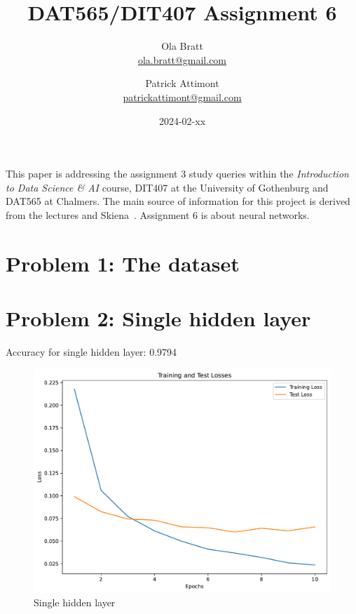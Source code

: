 \documentclass[a4paper]{article}
\begin{document}
\author{Ola Bratt \\
  \href{mailto:ola.bratt@gmail.com}{ola.bratt@gmail.com}
  \and
  Patrick Attimont \\
  \href{patrickattimont@gmail.com}{patrickattimont@gmail.com}
}

\title{DAT565/DIT407 Assignment 6}
\date{2024-02-xx}

\maketitle

This paper is addressing the assignment 3 study queries within the \emph{Introduction to Data Science \& AI} course, DIT407 at 
the University of Gothenburg and DAT565 at Chalmers. The main source of information for this project
is derived from the lectures and Skiena~\cite{Skiena:2024}. Assignment 6 is about neural networks.

\section*{Problem 1: The dataset}


\section*{Problem 2: Single hidden layer}

Accuracy for single hidden layer: 0.9794

\begin{figure}[H]
  \begin{center}
    \includegraphics[width=\textwidth]{ola/single_hidden_layer.pdf}
    \caption{Single hidden layer}
    \label{fig:single_hidden_layer}
  \end{center}
\end{figure}
\end{document}
